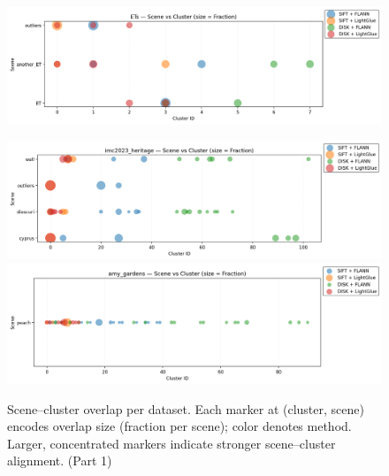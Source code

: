 \documentclass[report.tex]{subfiles}
\begin{document}

\begin{figure}[!htbp]
\centering
\includegraphics[width=\linewidth]{images/scene_cluster_by_dataset/ETs.png}

\includegraphics[width=\linewidth]{images/scene_cluster_by_dataset/imc2023_heritage.png}
\includegraphics[width=\linewidth]{images/scene_cluster_by_dataset/amy_gardens.png}
\caption{Scene–cluster overlap per dataset. Each marker at (cluster, scene) encodes overlap size (fraction per scene); color denotes method. Larger, concentrated markers indicate stronger scene–cluster alignment. (Part 1)}
\end{figure}
\end{document}
